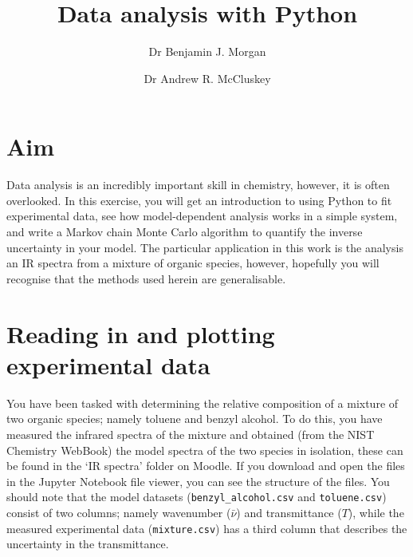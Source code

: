 \documentclass[a4paper]{article}
\title{Data analysis with Python}
\author[1]{Dr Benjamin J. Morgan}
\author[1,2]{Dr Andrew R. McCluskey}
\affil[1]{Department of Chemistry, University of Bath, email: b.j.morgan@bath.ac.uk}
\affil[2]{Diamond Light Source, email: andrew.mccluskey@diamond.ac.uk}
\begin{document}
\maketitle

\section*{Aim}
Data analysis is an incredibly important skill in chemistry, however, it is often overlooked. 
In this exercise, you will get an introduction to using Python to fit experimental data, see how model-dependent analysis works in a simple system, and write a Markov chain Monte Carlo algorithm to quantify the inverse uncertainty in your model.
The particular application in this work is the analysis an IR spectra from a mixture of organic species, however, hopefully you will recognise that the methods used herein are generalisable.

\section{Reading in and plotting experimental data}
You have been tasked with determining the relative composition of a mixture of two organic species; namely toluene and benzyl alcohol. 
To do this, you have measured the infrared spectra of the mixture and obtained (from the NIST Chemistry WebBook) the model spectra of the two species in isolation, these can be found in the `IR spectra' folder on Moodle. 
If you download and open the files in the Jupyter Notebook file viewer, you can see the structure of the files. 
You should note that the model datasets (\texttt{benzyl\_alcohol.csv} and \texttt{toluene.csv}) consist of two columns; namely wavenumber ($\bar{\nu}$) and transmittance ($T$), while the measured experimental data (\texttt{mixture.csv}) has a third column that describes the uncertainty in the transmittance. 

\vspace{\baselineskip}
\begin{center}
	\noindent{}
\end{center}
\end{document}
